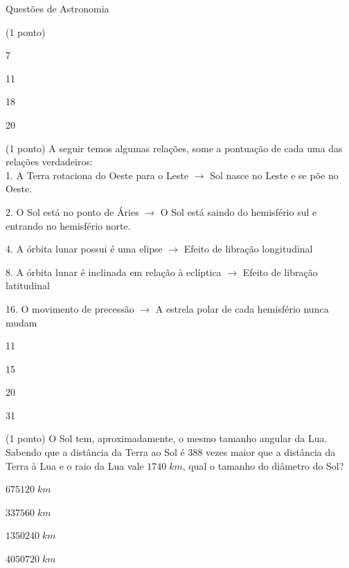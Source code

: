 \documentclass{../lista}
\begin{document}
\begin{secao}{Questões de Astronomia}
\begin{questao}{(1 ponto)}
			\begin{alternativas}
				\item 7
				\item 11
				\item 18
				\item 20
			\end{alternativas}
		\end{questao}

		\begin{questao}{(1 ponto)}
			A seguir temos algumas relações, some a pontuação de cada uma das relações verdadeiros: \\
			
			1. A Terra rotaciona do Oeste para o Leste $\rightarrow$ Sol nasce no Leste e se põe no Oeste.
			
			2. O Sol está no ponto de Áries $\rightarrow$ O Sol está saindo do hemisfério sul e entrando no hemisfério norte.
			
			4. A órbita lunar possui é uma elipse $\rightarrow$ Efeito de libração longitudinal
			
			8. A órbita lunar é inclinada em relação à eclíptica $\rightarrow$ Efeito de libração latitudinal
			
			16. O movimento de precessão $\rightarrow$ A estrela polar de cada hemisfério nunca mudam
			
			\begin{alternativas}
				\item 11
				\item 15
				\item 20
				\item 31
			\end{alternativas}
		\end{questao}

		\begin{questao}{(1 ponto)}
			O Sol tem, aproximadamente, o mesmo tamanho angular da Lua. Sabendo que a distância da Terra ao Sol é 388 vezes maior que a distância da Terra à Lua e o raio da Lua vale $1740 \; km$, qual o tamanho do diâmetro do Sol?
			
			\begin{alternativas}
				\item $675120 \; km$
				\item $337560 \; km$
				\item $1350240 \; km$
				\item $4050720 \; km$
			\end{alternativas}
		\end{questao}


\end{secao}
\end{document}

